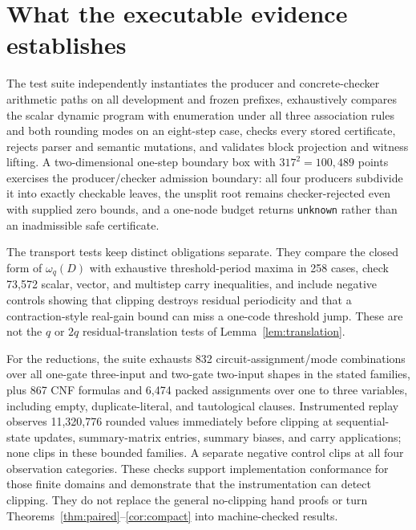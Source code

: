 \documentclass[11pt]{article}
\begin{document}
\section{What the executable evidence establishes}
The test suite independently instantiates the producer and concrete-checker arithmetic paths on all development and frozen prefixes, exhaustively compares the scalar dynamic program with enumeration under all three association rules and both rounding modes on an eight-step case, checks every stored certificate, rejects parser and semantic mutations, and validates block projection and witness lifting. A two-dimensional one-step boundary box with $317^2=100{,}489$ points exercises the producer/checker admission boundary: all four producers subdivide it into exactly checkable leaves, the unsplit root remains checker-rejected even with supplied zero bounds, and a one-node budget returns \texttt{unknown} rather than an inadmissible safe certificate.

The transport tests keep distinct obligations separate. They compare the closed form of $\omega_q(D)$ with exhaustive threshold-period maxima in 258 cases, check 73,572 scalar, vector, and multistep carry inequalities, and include negative controls showing that clipping destroys residual periodicity and that a contraction-style real-gain bound can miss a one-code threshold jump. These are not the $q$ or $2q$ residual-translation tests of Lemma~\ref{lem:translation}.

For the reductions, the suite exhausts 832 circuit-assignment/mode combinations over all one-gate three-input and two-gate two-input shapes in the stated families, plus 867 CNF formulas and 6,474 packed assignments over one to three variables, including empty, duplicate-literal, and tautological clauses. Instrumented replay observes 11,320,776 rounded values immediately before clipping at sequential-state updates, summary-matrix entries, summary biases, and carry applications; none clips in these bounded families. A separate negative control clips at all four observation categories. These checks support implementation conformance for those finite domains and demonstrate that the instrumentation can detect clipping. They do not replace the general no-clipping hand proofs or turn Theorems~\ref{thm:paired}--\ref{cor:compact} into machine-checked results.
\end{document}
